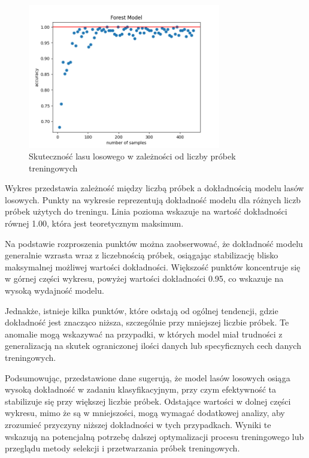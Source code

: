 \documentclass{article}
\begin{document}
\begin{figure}[H]
    \centering
    \includegraphics[width=0.75\textwidth]{transfer_labelling_forest.png}
    \caption{Skuteczność lasu losowego w zależności od liczby próbek treningowych}
\end{figure}

Wykres przedstawia zależność między liczbą próbek a dokładnością modelu lasów losowych. Punkty na wykresie reprezentują dokładność modelu dla różnych liczb próbek użytych do treningu. Linia pozioma wskazuje na wartość dokładności równej 1.00, która jest teoretycznym maksimum.

Na podstawie rozproszenia punktów można zaobserwować, że dokładność modelu generalnie wzrasta wraz z liczebnością próbek, osiągając stabilizację blisko maksymalnej możliwej wartości dokładności. Większość punktów koncentruje się w górnej części wykresu, powyżej wartości dokładności 0.95, co wskazuje na wysoką wydajność modelu.

Jednakże, istnieje kilka punktów, które odstają od ogólnej tendencji, gdzie dokładność jest znacząco niższa, szczególnie przy mniejszej liczbie próbek. Te anomalie mogą wskazywać na przypadki, w których model miał trudności z generalizacją na skutek ograniczonej ilości danych lub specyficznych cech danych treningowych.

Podsumowując, przedstawione dane sugerują, że model lasów losowych osiąga wysoką dokładność w zadaniu klasyfikacyjnym, przy czym efektywność ta stabilizuje się przy większej liczbie próbek. Odstające wartości w dolnej części wykresu, mimo że są w mniejszości, mogą wymagać dodatkowej analizy, aby zrozumieć przyczyny niższej dokładności w tych przypadkach. Wyniki te wskazują na potencjalną potrzebę dalszej optymalizacji procesu treningowego lub przeglądu metody selekcji i przetwarzania próbek treningowych.
\newpage
\end{document}
